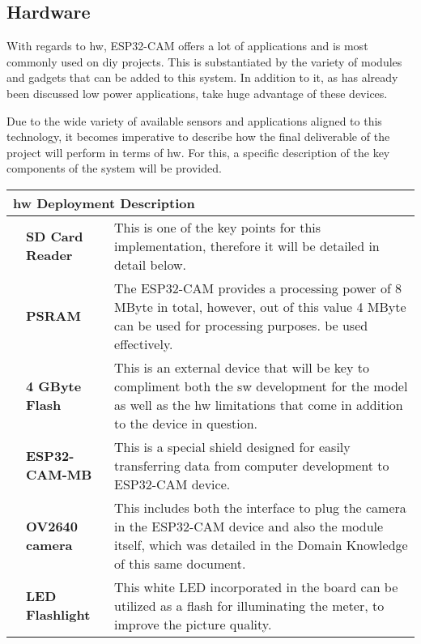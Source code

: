 \subsection{Hardware}

With regards to \ac{hw}, ESP32-CAM offers a lot of applications and is most commonly used on \ac{diy} projects. This is substantiated by the variety of modules and gadgets that can be added to this system. In addition to it, as has already been discussed low power applications, take huge advantage of these devices.  \cite{Babiuch:2019} 

Due to the wide variety of available sensors and applications aligned to this technology, it becomes imperative to describe how the final deliverable of the project will perform in terms of \ac{hw}. For this, a specific description of the key components of the system will be provided.

\bigskip


\begin{tabular}{llp{95mm}}
	\multicolumn{3}{l}{\large \textbf{\ac{hw} Deployment Description}}  \\ 
	\hline 
	& \textbf{SD Card Reader}  & This is one of the key points for this implementation, therefore it will be detailed in detail below. \\
	& \textbf{PSRAM} & The ESP32-CAM provides a processing power of 8 MByte in total, however, out of this value 4 MByte can be used for processing purposes.
	be used effectively. \\
	& \textbf{4 GByte Flash} & This is an external device that will be key to compliment both the \ac{sw} development for the model as well as the \ac{hw} limitations that come in addition to the device in question. \\
	& \textbf{ESP32-CAM-MB} & This is a special shield designed for easily transferring data from computer development to ESP32-CAM device. \\
	& \textbf{OV2640 camera} & This includes both the interface to plug the camera in the ESP32-CAM device and also the module itself, which was detailed in the Domain Knowledge of this same document.\\
	& \textbf{LED Flashlight} & This white LED incorporated in the board can be utilized as a flash for illuminating the meter, to improve the picture quality. \\
\end{tabular} \\

